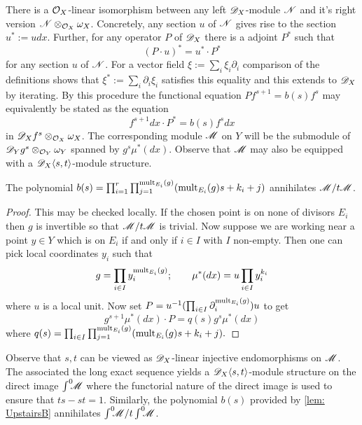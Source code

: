 There is a $\mathcal{O}_X$-linear isomorphism between any left $\mathscr{D}_X$-module $\mathscr{N}$ and it's right version $ \mathscr{N} \otimes_{\mathcal{O}_X}\omega_X$.
Concretely, any section $u$ of $\mathscr{N}$ gives rise to the section $u^* := u dx$.
Further, for any operator $P$ of $\mathscr{D}_X$ there is a adjoint $P^*$ such that
$$(P\cdot u)^* =   u^* \cdot P^*$$
for any section $u$ of $\mathscr{N}$.
For a vector field $\xi := \sum_i\xi_i \partial_i$ comparison of the definitions shows that $\xi^* := \sum_i\partial_i\xi_i$ satisfies this equality and this extends to $\mathscr{D}_X$ by iterating.
By this procedure the functional equation $P f^{s+1} = b(s) f^s$ may equivalently be stated as the equation
$$f^{s+1}dx \cdot P^* = b(s) f^s dx $$
in $\mathscr{D}_X f^s \otimes_{\mathcal{O}_X}\omega_X$.
The corresponding module $\mathscr{M}$ on $Y$ will be the submodule of $\mathscr{D}_Y g^s \otimes_{\mathcal{O}_Y}\omega_Y$ spanned by $g^s \mu^*(dx)$.
Observe that $\mathscr{M}$ may also be equipped with a $\mathscr{D}_X\langle s,t\rangle$-module structure.
\begin{lemma}\label{lem: UpstairsB}
  The polynomial $b(s) = \prod_{i=1}^r \prod_{j=1}^{\operatorname{mult}_{E_i}(g)} (\operatorname{mult}_{E_i}(g)s + k_i + j)$ annihilates $\mathscr{M} / t\mathscr{M}$.
\end{lemma}
\begin{proof}
  This may be checked locally.
  If the chosen point is on none of divisors $E_i$ then $g$ is invertible so that $\mathscr{M}/t\mathscr{M}$ is trivial.
  Now suppose we are working near a point $y\in Y$ which is on $E_i$ if and only if $i\in I$ with $I$ non-empty.
  Then one can pick local coordinates $y_i$ such that
  $$ g = \prod_{i\in I} y_i^{\operatorname{mult}_{E_i}(g)}; \qquad \mu^*(dx) =u \prod_{i\in I} y_i^{k_i}$$
  where $u$ is a local unit.
  Now set $P = u^{-1}(\prod_{i\in I}\partial_i^{\operatorname{mult}_{E_i}(g)})u$ to get
  $$g^{s+1} \mu^*(dx)\cdot P = q(s) g^s \mu^*(dx)$$
  where $q(s) = \prod_{i\in I}\prod_{j=1}^{\operatorname{mult}_{E_i}(g)} (\operatorname{mult}_{E_i}(g)s +  k_i + j ). $
\end{proof}
Observe that $s,t$ can be viewed as $\mathscr{D}_X$-linear injective endomorphisms on $\mathscr{M}$.
The associated the long exact sequence yields a $\mathscr{D}_X\langle s,t\rangle$-module structure on the direct image $\int^0 \mkern -8mu\mathscr{M}$ where the functorial nature of the direct image is used to ensure that $ts -st = 1$.
Similarly, the polynomial $ b(s)$ provided by \cref{lem: UpstairsB} annihilates $\int^0 \mkern -8mu\mathscr{M}/t\int^0 \mkern -8mu\mathscr{M}$.


